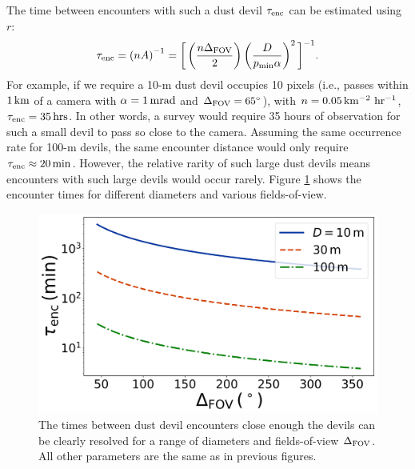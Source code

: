 \documentclass{aastex63}
\begin{document}
The time between encounters with such a dust devil $\tau_{\rm enc}$ can be estimated using $r$:
\begin{equation}
    \tau_{\rm enc} = \left( n A \right)^{-1} = \bigg[ \left( \frac{n \Delta_{\rm FOV}}{2} \right) \left( \frac{D}{p_{\rm min} \alpha } \right)^2 \bigg]^{-1}.
    \label{eqn:tau}
\end{equation}
For example, if we require a 10-m dust devil occupies 10 pixels (i.e., passes within $1\,{\rm km}$ of a camera with $\alpha = 1\,{\rm mrad}$ and $\Delta_{\rm FOV} = 65^\circ$), with $n = 0.05\,{\rm km^{-2}\ hr^{-1}}$, $\tau_{\rm enc} = 35\,{\rm hrs}$. In other words, a survey would require 35 hours of observation for such a small devil to pass so close to the camera. Assuming the same occurrence rate for 100-m devils, the same encounter distance would only require $\tau_{\rm enc} \approx 20\,{\rm min}$. However, the relative rarity of such large dust devils means encounters with such large devils would occur rarely. Figure \ref{fig:encounter_time} shows the encounter times for different diameters and various fields-of-view.

\begin{figure}
    \centering
    \includegraphics[width=\textwidth]{figures/encounter_time.jpg}
    \caption{The times between dust devil encounters close enough the devils can be clearly resolved for a range of diameters and fields-of-view $\Delta_{\rm FOV}$. All other parameters are the same as in previous figures.}
    \label{fig:encounter_time}
\end{figure}
\end{document}
